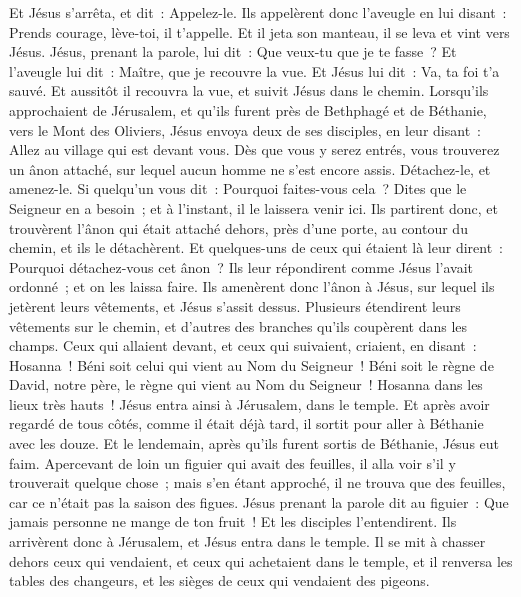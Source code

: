 \begin{multicols}{2}
Et Jésus s'arrêta, et dit~: Appelez-le. Ils appelèrent donc l'aveugle en lui disant~: Prends courage, lève-toi, il t'appelle.
Et il jeta son manteau, il se leva et vint vers Jésus.
Jésus, prenant la parole, lui dit~: Que veux-tu que je te fasse~? Et l'aveugle lui dit~: Maître, que je recouvre la vue.
Et Jésus lui dit~: Va, ta foi t'a sauvé.
Et aussitôt il recouvra la vue, et suivit Jésus dans le chemin.
\VerseOne{}Lorsqu'ils approchaient de Jérusalem, et qu'ils furent près de Bethphagé et de Béthanie, vers le Mont des Oliviers, Jésus envoya deux de ses disciples,
en leur disant~: Allez au village qui est devant vous. Dès que vous y serez entrés, vous trouverez un ânon attaché, sur lequel aucun homme ne s'est encore assis. Détachez-le, et amenez-le.
Si quelqu'un vous dit~: Pourquoi faites-vous cela~? Dites que le Seigneur en a besoin~; et à l'instant, il le laissera venir ici.
Ils partirent donc, et trouvèrent l'ânon qui était attaché dehors, près d'une porte, au contour du chemin, et ils le détachèrent.
Et quelques-uns de ceux qui étaient là leur dirent~: Pourquoi détachez-vous cet ânon~?
Ils leur répondirent comme Jésus l'avait ordonné~; et on les laissa faire.
Ils amenèrent donc l'ânon à Jésus, sur lequel ils jetèrent leurs vêtements, et Jésus s'assit dessus.
Plusieurs étendirent leurs vêtements sur le chemin, et d'autres des branches qu'ils coupèrent dans les champs.
Ceux qui allaient devant, et ceux qui suivaient, criaient, en disant~: Hosanna~! Béni soit celui qui vient au Nom du Seigneur~!
Béni soit le règne de David, notre père, le règne qui vient au Nom du Seigneur~! Hosanna dans les lieux très hauts~!
Jésus entra ainsi à Jérusalem, dans le temple. Et après avoir regardé de tous côtés, comme il était déjà tard, il sortit pour aller à Béthanie avec les douze.
Et le lendemain, après qu'ils furent sortis de Béthanie, Jésus eut faim.
Apercevant de loin un figuier qui avait des feuilles, il alla voir s'il y trouverait quelque chose~; mais s'en étant approché, il ne trouva que des feuilles, car ce n'était pas la saison des figues.
Jésus prenant la parole dit au figuier~: Que jamais personne ne mange de ton fruit~! Et les disciples l'entendirent.
Ils arrivèrent donc à Jérusalem, et Jésus entra dans le temple. Il se mit à chasser dehors ceux qui vendaient, et ceux qui achetaient dans le temple, et il renversa les tables des changeurs, et les sièges de ceux qui vendaient des pigeons.

\end{multicols}
